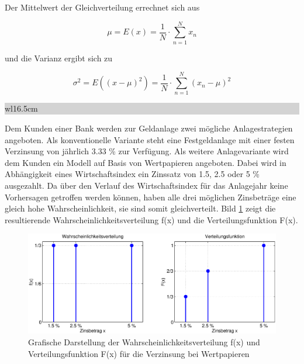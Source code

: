 \clearpage

\noindent Der Mittelwert der Gleichverteilung errechnet sich aus 

\begin{equation}\label{eq:fourhundredeighteen}
\mu =E(x)=\dfrac{1}{N} \cdot \sum _{n=1}^{N}x_{n}
\end{equation}

\noindent und die Varianz ergibt sich zu

\begin{equation}\label{eq:fourhundrednineteen}
\sigma ^{2} =E\left((x-\mu )^{2} \right)=\dfrac{1}{N} \cdot \sum _{n=1}^{N}(x_{n} -\mu)^{2} 
\end{equation}

\noindent
\colorbox{lightgray}{%
%
\renewcommand\arraystretch{0.6}%
\begin{tabular}{ wl{16.5cm} }
{}
\end{tabular}%
}\medskip 

\noindent Dem Kunden einer Bank werden zur Geldanlage zwei m\"{o}gliche Anlagestrategien angeboten. Als konventionelle Variante steht eine Festgeldanlage mit einer festen Verzinsung von j\"{a}hrlich 3.33 \% zur Verf\"{u}gung. Als weitere Anlagevariante wird dem Kunden ein Modell auf Basis von Wertpapieren angeboten. Dabei wird in Abh\"{a}ngigkeit eines Wirtschaftsindex ein Zinssatz von 1.5, 2.5 oder 5 \% ausgezahlt. Da \"{u}ber den Verlauf des Wirtschaftsindex f\"{u}r das Anlagejahr keine Vorhersagen getroffen werden k\"{o}nnen, haben alle drei m\"{o}glichen Zinsbetr\"{a}ge eine gleich hohe Wahrscheinlichkeit, sie sind somit gleichverteilt. Bild \ref{fig:Diskret_Gleichverteilung_Anlagemoeglichkeiten} zeigt die resultierende Wahrscheinlichkeitsverteilung f(x) und die Verteilungsfunktion F(x).

\noindent 
\begin{figure}[H]
  \centerline{\includegraphics[width=1\textwidth]{Kapitel4/Bilder/image10}}
  \caption{Grafische Darstellung der Wahrscheinlichkeitsverteilung f(x) und Verteilungsfunktion F(x) f\"{u}r die Verzinsung bei Wertpapieren}
  \label{fig:Diskret_Gleichverteilung_Anlagemoeglichkeiten}
\end{figure}

